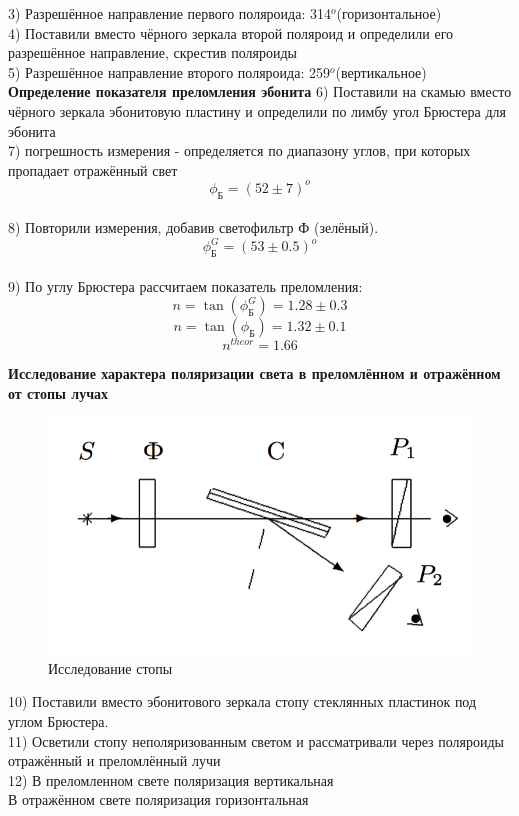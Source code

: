 \documentclass[a4paper,12pt]{article} %
\begin{document}
 3) Разрешённое направление первого поляроида: 314$^o$(горизонтальное)\\
	
 4) Поставили вместо чёрного зеркала второй поляроид и определили его разрешённое направление, скрестив поляроиды\\
 
 5) Разрешённое направление второго поляроида: 259$^o$(вертикальное)\\
	

\textbf{Определение показателя преломления эбонита}
 6) Поставили на скамью вместо чёрного зеркала эбонитовую пластину и определили по лимбу угол Брюстера для эбонита\\
 7) погрешность измерения - определяется по диапазону углов, при которых пропадает отражённый свет
$$\phi_{\text{Б}} = (52\pm 7)^o$$\\

 8) Повторили измерения, добавив светофильтр Ф (зелёный).
$$\phi_{\text{Б}}^G = (53\pm 0.5)^o$$\\
 9) По углу Брюстера рассчитаем показатель преломления:\\
$$n = \tan (\phi_{\text{Б}}^G ) = 1.28\pm0.3$$
$$n = \tan (\phi_{\text{Б}} ) = 1.32\pm0.1$$
$$n^{theor} = 1.66$$

\textbf{Исследование характера поляризации света в преломлённом и отражённом от стопы лучах}
\begin{figure}[H]
	\centering
	\includegraphics[height= 5 cm]{3.png}
	\caption{Исследование стопы}
\end{figure} 
 10) Поставили вместо эбонитового зеркала стопу стеклянных пластинок под углом Брюстера.\\
 11) Осветили стопу неполяризованным светом и рассматривали через поляроиды отражённый и преломлённый лучи\\
 12) В преломленном свете поляризация вертикальная \\
  В отражённом свете поляризация  горизонтальная
\\
\end{document}
